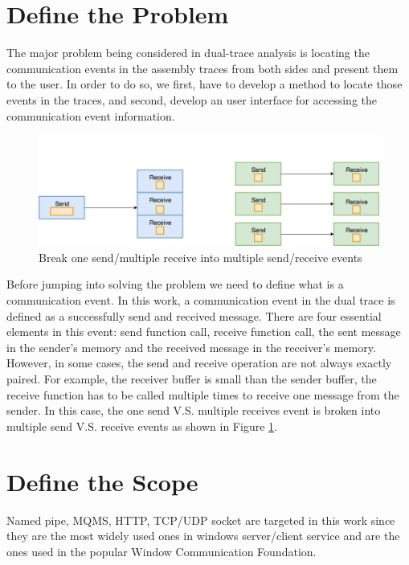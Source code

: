 \label{chapter:problem}

\newlength{\savedunitlength}
\setlength{\unitlength}{2em}
\section{Define the Problem}
The major problem being considered in dual-trace analysis is locating the communication events in the assembly traces from both sides and present them to the user. In order to do so,  we first, have to develop a method to locate those events in the traces, and second, develop an user interface for accessing the communication event information.\par

\begin{figure}[h]
\includegraphics[scale=.415]{Figures/event}
 \caption{Break one send/multiple receive into multiple send/receive events}
\label{event}
\end{figure}

Before jumping into solving the problem we need to define what is a communication event. In this work, a communication event in the dual trace is defined as a successfully send and received message. There are four essential elements in this event: send function call, receive function call, the sent message in the sender's memory and the received message in the receiver's memory. However, in some cases, the send and receive operation are not always exactly paired. For example, the receiver buffer is small than the sender buffer, the receive function has to be called multiple times to receive one message from the sender. In this case, the one send V.S. multiple receives event is broken into multiple send V.S. receive events as shown in Figure \ref{event}. 



\section{Define the Scope}
Named pipe, MQMS, HTTP, TCP/UDP socket are targeted in this work since they are the most widely used ones in windows server/client service and are the ones used in the popular Window Communication Foundation.


